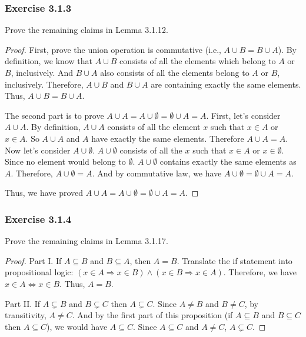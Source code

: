 \documentclass[12pt, letter]{article}
\begin{document}
\subsubsection*{Exercise 3.1.3}
Prove the remaining claims in Lemma 3.1.12.
\begin{proof}
    First, prove the union operation is commutative (i.e., $A\cup B=B\cup A$). By definition, we know that $A\cup B$ consists of all the elements which belong to $A$ or $B$, inclusively. 
    And $B\cup A$ also consists of all the elements belong to $A$ or $B$, inclusively. Therefore, $A\cup B$ and $B\cup A$ are containing exactly the same elements. Thus, $A\cup B=B\cup A$.
    
    The second part is to prove $A\cup A=A\cup\emptyset=\emptyset\cup A=A$. First, let's consider $A\cup A$. By definition, $A\cup A$ consists of all the element $x$ such that $x\in A$ or $x\in A$. So $A\cup A$ and $A$ have exactly the same elements. Therefore $A\cup A=A$.
    Now let's consider $A\cup\emptyset$. $A\cup\emptyset$ consists of all the $x$ such that $x\in A$ or $x\in\emptyset$. Since no element would belong to $\emptyset$. $A\cup\emptyset$ contains exactly the same elements as $A$. Therefore, $A\cup\emptyset=A$. And by commutative law, 
    we have $A\cup\emptyset=\emptyset\cup A=A$.

    Thus, we have proved $A\cup A=A\cup\emptyset=\emptyset\cup A=A$.
\end{proof}
\subsubsection*{Exercise 3.1.4}
Prove the remaining claims in Lemma 3.1.17.
\begin{proof}
    Part I. If $A\subseteq B$ and $B\subseteq A$, then $A=B$. Translate the if statement into propositional logic: $(x\in A \Rightarrow x\in B) \wedge (x\in B\Rightarrow x\in A)$. Therefore, we have $x\in A\iff x\in B$. Thus, $A=B$.

    Part II. If $A\subsetneq B$ and $B\subsetneq C$ then $A\subsetneq C$. Since $A\ne B$ and $B\ne C$, by transitivity, $A\ne C$. And by the first part of this proposition (if $A\subseteq B$ and $B\subseteq C$ then $A\subseteq C$), we would have $A\subseteq C$. Since $A\subseteq C$ and $A\ne C$, $A\subsetneq C$.
\end{proof}
\end{document}
